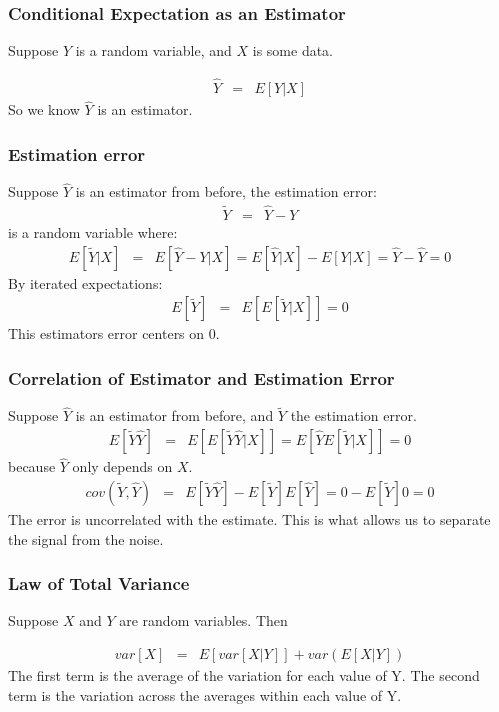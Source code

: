 \documentclass[handout]{beamer}
\numberwithin{equation}{section}
\begin{document}
\begin{frame}
\frametitle{Conditional Expectation as an Estimator}
Suppose $Y$ is a random variable, and $X$ is some data.

\begin{eqnarray}
\hat{Y} & = & E[Y|X] \nonumber 
\end{eqnarray}\pause
So we know $\hat{Y}$ is an estimator.\\


\end{frame}


\begin{frame}
\frametitle{Estimation error}
Suppose $\hat{Y}$ is an estimator from before, the estimation error:
\begin{eqnarray}
\tilde{Y} & = & \hat{Y}-Y \nonumber 
\end{eqnarray}\pause
is a random variable where:
\begin{eqnarray}
E[\tilde{Y}|X] & = & E[ \hat{Y}-Y|X]=E[ \hat{Y}|X]-E[Y|X]=\hat{Y} -\hat{Y} =0\nonumber 
\end{eqnarray}\pause
By iterated expectations:\pause
\begin{eqnarray}
E[\tilde{Y}] & = & E[E[ \tilde{Y}|X]]=0 \nonumber 
\end{eqnarray}\pause
This estimators error centers on 0.

\end{frame}


\begin{frame}
\frametitle{Correlation of  Estimator and Estimation Error}
Suppose $\hat{Y}$ is an estimator from before, and $\tilde{Y}$ the estimation error.
\begin{eqnarray}
E[\tilde{Y}\hat{Y}] & = & E[E[\tilde{Y}\hat{Y}|X]]=E[\hat{Y}E[\tilde{Y}|X]]=0 \nonumber 
\end{eqnarray}\pause
because $\hat{Y}$ only depends on $X$.\pause
\begin{eqnarray}
cov(\tilde{Y},\hat{Y}) & = & E[ \tilde{Y}\hat{Y}]-E[\tilde{Y}]E[\hat{Y}]=0- E[\tilde{Y}]0=0\nonumber 
\end{eqnarray}\pause
The error is uncorrelated with the estimate.  This is what allows us to separate the signal from the noise.
\end{frame}


\begin{frame}
\frametitle{Law of Total Variance}
Suppose $X$ and $Y$ are random variables.  Then 

\begin{eqnarray}
var[X] & = & E[var[X|Y]]+var(E[X|Y]) \nonumber 
\end{eqnarray}
The first term is the average of the variation for each value of Y.\pause
The second term is the variation across the averages within each value of Y.
\end{frame}
\end{document}
